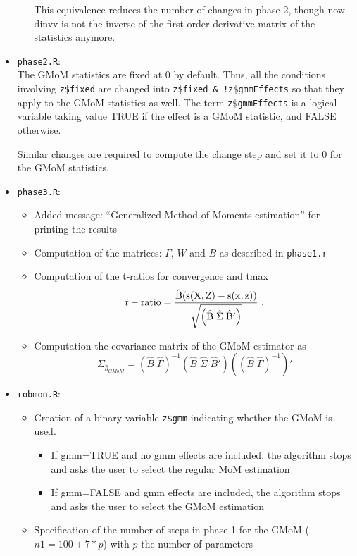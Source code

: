 \documentclass[a4paper,11pt]{article}
\begin{document}
\begin{itemize}
\begin{itemize}
This equivalence reduces the number of changes in phase 2, though now dinvv is not the inverse of the first order derivative matrix of the statistics anymore.
\end{itemize} 

\item \texttt{phase2.R}:\\
The GMoM statistics are fixed at 0 by default. Thus, all the conditions involving \texttt{z\$fixed} are changed  into \texttt{z\$fixed \& !z\$gmmEffects} so that they apply to the GMoM statistics as well. The term \texttt{z\$gmmEffects} is a logical variable taking value TRUE if the effect is a GMoM statistic, and FALSE otherwise. 

Similar changes are required to compute the change step and set it to 0 for the GMoM statistics.

\item \texttt{phase3.R}:\\
\begin{itemize}
	\item Added message: ``Generalized Method of Moments estimation'' for printing the results
	\item Computation of the matrices: $\Gamma$, $W$ and $B$ as described in \texttt{phase1.r}
	\item Computation of the t-ratios for convergence and tmax
	\[t-\rm{ratio} = \frac{\hat{B}(s(X,Z)-s(x,z))}
{\sqrt{ \left(\hat{B}\;\hat{\Sigma}\;\hat{B}' \right)}} \ .\]
	\item Computation the covariance matrix of the GMoM estimator as
\[\Sigma_{\widehat{\theta}_{GMoM}}=(\hat{B}\;\hat{\Gamma})^{-
1}(\hat{B}\;\hat{\Sigma}\;\hat{B}')((\hat{B}\;\hat{\Gamma})^{-1})'\]
\end{itemize}

\item \texttt{robmon.R}:
\begin{itemize}
	\item Creation of a binary variable \texttt{z\$gmm} indicating whether the GMoM is used.
\begin{itemize}
  \item If gmm=TRUE and no gmm effects are included, the algorithm stops and asks the user to select the regular MoM estimation
	\item If gmm=FALSE and gmm effects are included, the algorithm stops and asks the user to select the GMoM estimation
\end{itemize}
\item Specification of the number of steps in phase 1 for the GMoM ($n1=100 + 7 *p$) with $p$ the number of parameters
\end{itemize}



\end{itemize}
\end{document}

